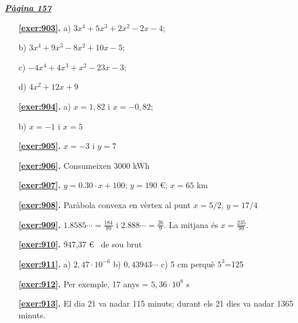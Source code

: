 
\hyperlink{page.157}{\textbf{\em Pàgina 157}}
\begin{enumerate}
\item[\fontfamily{phv}\selectfont\color{blue}\textbf{\ref{exer:903}. }] \label{ans:903} 
 a) $3x^4+5x^3+2x^2-2x-4$; \par b) $3x^4+9x^3-8x^2+10x-5$; \par c) $-4x^4+4x^3+x^2-23x-3$; \par d) $4x^2+12x+9$
 \end{enumerate}
\begin{enumerate}
\item[\fontfamily{phv}\selectfont\color{blue}\textbf{\ref{exer:904}. }] \label{ans:904} 
 a) $x=1,82$ i $x=-0,82$; \par b) $x=-1$ i $x=5$
\item[\fontfamily{phv}\selectfont\color{blue}\textbf{\ref{exer:905}. }] \label{ans:905} 
 $x=-3$ i $y=7$
\item[\fontfamily{phv}\selectfont\color{blue}\textbf{\ref{exer:906}. }] \label{ans:906} 
 Consumeixen $3000$ kWh
\item[\fontfamily{phv}\selectfont\color{blue}\textbf{\ref{exer:907}. }] \label{ans:907} 
 $y=0.30 \cdot x + 100$; \quad $y=190$ €; \quad $x=65$ km
\item[\fontfamily{phv}\selectfont\color{blue}\textbf{\ref{exer:908}. }] \label{ans:908} 
 Paràbola convexa en vèrtex al punt $x=5/2$, $y=17/4$
\item[\fontfamily{phv}\selectfont\color{blue}\textbf{\ref{exer:909}. }] \label{ans:909} 
 $1.8585\cdots = \frac {184}{99}$ i $2.888 \cdots = \frac {26}{9}$. La mitjana és $x=\frac {235}{99}$. 
\item[\fontfamily{phv}\selectfont\color{blue}\textbf{\ref{exer:910}. }] \label{ans:910} 
 947,37 \euro {} \ de sou brut
\item[\fontfamily{phv}\selectfont\color{blue}\textbf{\ref{exer:911}. }] \label{ans:911} 
 a) $2,47\cdot 10^{-6}$ \quad b) $0,43943\cdots $ \quad c) 5 cm perquè $5^{3}$=125
\item[\fontfamily{phv}\selectfont\color{blue}\textbf{\ref{exer:912}. }] \label{ans:912} 
 Per exemple, 17 anys = $5,36\cdot 10^{8}$ s
\item[\fontfamily{phv}\selectfont\color{blue}\textbf{\ref{exer:913}. }] \label{ans:913} 
El dia 21 va nadar 115 minuts; durant els 21 dies va nadar 1365 minuts.
 \end{enumerate}
\vspace{0.3cm}

